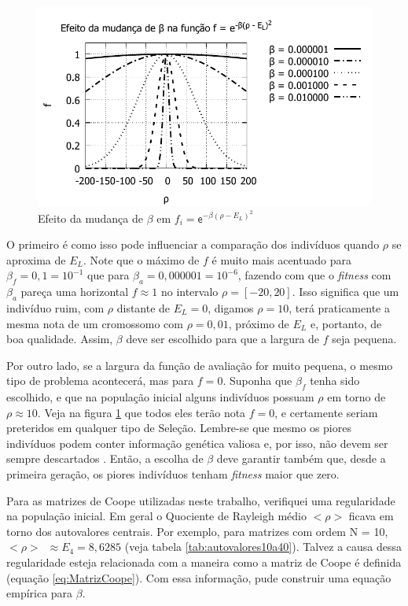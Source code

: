 	\begin{figure}[h]
		\centering
			\includegraphics[width=1.0\textwidth]{figs/resultados/precisaoFitness/f_varios_lambdas.pdf}
		\caption{Efeito da mudança de $\beta$ em $f_i = \mathsf{e}^{-\beta(\rho - E_L)^2}$}
		\label{fig:f_efeito_lambda}
	\end{figure}
	
	 O primeiro é como isso pode influenciar a comparação dos indivíduos quando $\rho$ se aproxima de $E_L$. Note que o máximo de $f$ é muito mais acentuado para $\beta_f = 0,1 = 10^{-1}$ que para $\beta_a = 0,000001 = 10^{-6}$, fazendo com que o \emph{fitness} com $\beta_a$ pareça uma horizontal $f \approx 1$ no intervalo $\rho = [-20,20]$. Isso significa que um indivíduo ruim, com $\rho$ distante de $E_L = 0$, digamos $\rho = 10$, terá praticamente a mesma nota de um cromossomo com $\rho = 0,01$, próximo de $E_L$ e, portanto, de boa qualidade. Assim, $\beta$ deve ser escolhido para que a largura de $f$ seja pequena.
	
	Por outro lado, se a largura da função de avaliação for muito pequena, o mesmo tipo de problema acontecerá, mas para $f = 0$. Suponha que $\beta_f$ tenha sido escolhido, e que na população inicial alguns indivíduos possuam $\rho$ em torno de $\rho \approx 10$. Veja na figura \ref{fig:f_efeito_lambda} que todos eles terão nota $f = 0$, e certamente seriam preteridos em qualquer tipo de Seleção. Lembre-se que mesmo os piores indivíduos podem conter informação genética valiosa e, por isso, não devem ser sempre descartados \cite{Mitchell98}. Então, a escolha de $\beta$ deve garantir também que, desde a primeira geração, os piores indivíduos tenham \emph{fitness} maior que zero.

	Para as matrizes de Coope utilizadas neste trabalho, verifiquei uma regularidade na população inicial. Em geral o Quociente de Rayleigh médio $<\rho>$ ficava em torno dos autovalores centrais. Por exemplo, para matrizes com ordem N = 10, \mbox{$<\rho>$ $\approx E_4 = 8,6285$} (veja tabela \ref{tab:autovalores10a40}). Talvez a causa dessa regularidade esteja relacionada com a maneira como a matriz de Coope é definida (equação \ref{eq:MatrizCoope}). Com essa informação, pude construir uma equação empírica para $\beta$.


